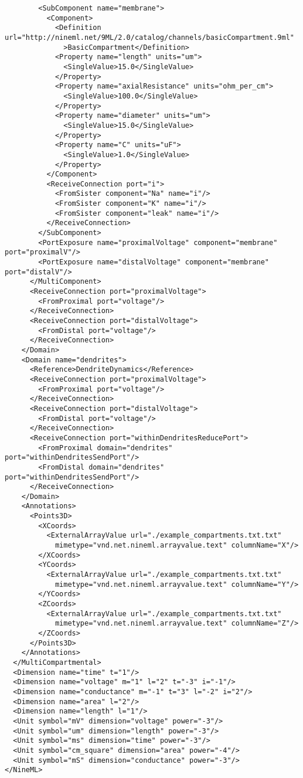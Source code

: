 \documentclass[draftspec]{ninemlspec}
\begin{document}
\begin{lstlisting}
        <SubComponent name="membrane">
          <Component>
            <Definition url="http://nineml.net/9ML/2.0/catalog/channels/basicCompartment.9ml"
              >BasicCompartment</Definition>
            <Property name="length" units="um">
              <SingleValue>15.0</SingleValue>
            </Property>
            <Property name="axialResistance" units="ohm_per_cm">
              <SingleValue>100.0</SingleValue>
            </Property>
            <Property name="diameter" units="um">
              <SingleValue>15.0</SingleValue>
            </Property>
            <Property name="C" units="uF">
              <SingleValue>1.0</SingleValue>
            </Property>
          </Component>
          <ReceiveConnection port="i">
            <FromSister component="Na" name="i"/>
            <FromSister component="K" name="i"/>
            <FromSister component="leak" name="i"/>
          </ReceiveConnection>
        </SubComponent>
        <PortExposure name="proximalVoltage" component="membrane" port="proximalV"/>
        <PortExposure name="distalVoltage" component="membrane" port="distalV"/>
      </MultiComponent>
      <ReceiveConnection port="proximalVoltage">
        <FromProximal port="voltage"/>
      </ReceiveConnection>
      <ReceiveConnection port="distalVoltage">
        <FromDistal port="voltage"/>
      </ReceiveConnection>
    </Domain>
    <Domain name="dendrites">
      <Reference>DendriteDynamics</Reference>
      <ReceiveConnection port="proximalVoltage">
        <FromProximal port="voltage"/>
      </ReceiveConnection>
      <ReceiveConnection port="distalVoltage">
        <FromDistal port="voltage"/>
      </ReceiveConnection>
      <ReceiveConnection port="withinDendritesReducePort">
        <FromProximal domain="dendrites" port="withinDendritesSendPort"/>
        <FromDistal domain="dendrites" port="withinDendritesSendPort"/>
      </ReceiveConnection>
    </Domain>
    <Annotations>
      <Points3D>
        <XCoords>
          <ExternalArrayValue url="./example_compartments.txt.txt"
            mimetype="vnd.net.nineml.arrayvalue.text" columnName="X"/>
        </XCoords>
        <YCoords>
          <ExternalArrayValue url="./example_compartments.txt.txt"
            mimetype="vnd.net.nineml.arrayvalue.text" columnName="Y"/>
        </YCoords>
        <ZCoords>
          <ExternalArrayValue url="./example_compartments.txt.txt"
            mimetype="vnd.net.nineml.arrayvalue.text" columnName="Z"/>
        </ZCoords>
      </Points3D>
    </Annotations>
  </MultiCompartmental>
  <Dimension name="time" t="1"/>
  <Dimension name="voltage" m="1" l="2" t="-3" i="-1"/>
  <Dimension name="conductance" m="-1" t="3" l="-2" i="2"/>
  <Dimension name="area" l="2"/>
  <Dimension name="length" l="1"/>
  <Unit symbol="mV" dimension="voltage" power="-3"/>
  <Unit symbol="um" dimension="length" power="-3"/>
  <Unit symbol="ms" dimension="time" power="-3"/>
  <Unit symbol="cm_square" dimension="area" power="-4"/>
  <Unit symbol="mS" dimension="conductance" power="-3"/>
</NineML>
\end{lstlisting}
\end{document}
